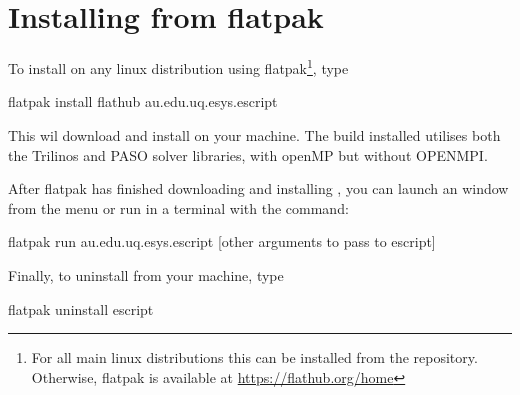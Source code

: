 %
%
%


\chapter{Installing from flatpak}\label{chap:flatpak}

To install \escript on any linux distribution using flatpak\footnote{For all main linux distributions this can be installed from the repository. Otherwise, flatpak is available at \url{https://flathub.org/home}}, type
\begin{shellCode}
flatpak install flathub au.edu.uq.esys.escript
\end{shellCode}

This wil download and install \escript on your machine. The \escript build installed utilises both the Trilinos and PASO solver libraries, with openMP but without OPENMPI. 

After flatpak has finished downloading and installing \escript, you can launch an \escript window from the menu or run \escript in a terminal with the command:
\begin{shellCode}
flatpak run au.edu.uq.esys.escript [other arguments to pass to escript]
\end{shellCode}

Finally, to uninstall \escript from your machine, type
\begin{shellCode}
flatpak uninstall escript
\end{shellCode}
